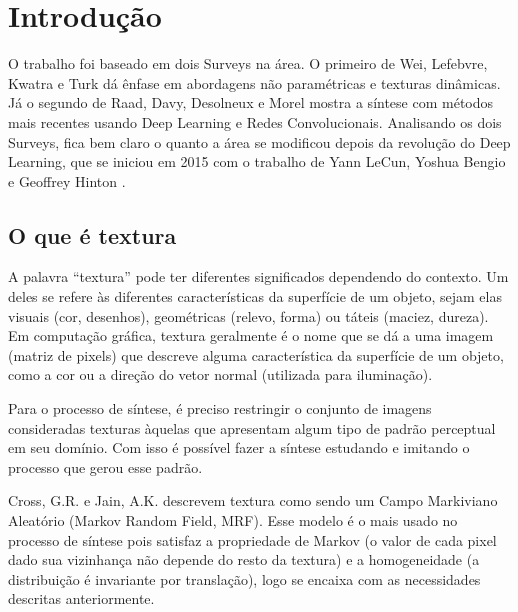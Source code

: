 \chapter{Introdução}



O trabalho foi baseado em dois Surveys
na área. O primeiro de Wei, Lefebvre, Kwatra
e Turk \cite{Wei2009} dá ênfase em
abordagens não paramétricas e texturas
dinâmicas. Já o segundo de Raad, Davy, 
Desolneux e Morel \cite{Raad2018} mostra
a síntese com métodos mais recentes
usando Deep Learning e Redes Convolucionais.
Analisando os dois Surveys, fica bem claro o 
quanto a área se modificou depois da
revolução do Deep Learning, que se iniciou
em 2015 com o trabalho de Yann LeCun, 
Yoshua Bengio e Geoffrey Hinton \cite{LeCun2015}.

\section{O que é textura}



A palavra ``textura'' pode ter diferentes significados
dependendo do contexto.
Um deles se refere às
diferentes características da superfície de um objeto,
sejam elas visuais (cor, desenhos), geométricas (relevo,
forma) ou táteis (maciez, dureza). 
Em computação gráfica, textura geralmente é
o nome que se dá a uma imagem (matriz de pixels)
que descreve alguma
característica da superfície de um objeto,
como a cor ou a direção do vetor normal (utilizada
para iluminação).


Para o processo de síntese, é preciso restringir o
conjunto de imagens consideradas texturas àquelas
que apresentam algum tipo de padrão perceptual
em seu domínio. Com isso é possível fazer a síntese
estudando e imitando o processo que gerou esse padrão.


Cross, G.R. e Jain, A.K. \cite{Cross1983} descrevem
textura como sendo um Campo Markiviano Aleatório
(Markov Random Field, MRF). Esse modelo é o mais
usado no processo de síntese pois satisfaz a propriedade
de Markov (o valor de cada pixel dado sua vizinhança não
depende do resto da textura) e a homogeneidade (a
distribuição é invariante por translação), logo
se encaixa com as necessidades descritas anteriormente.

